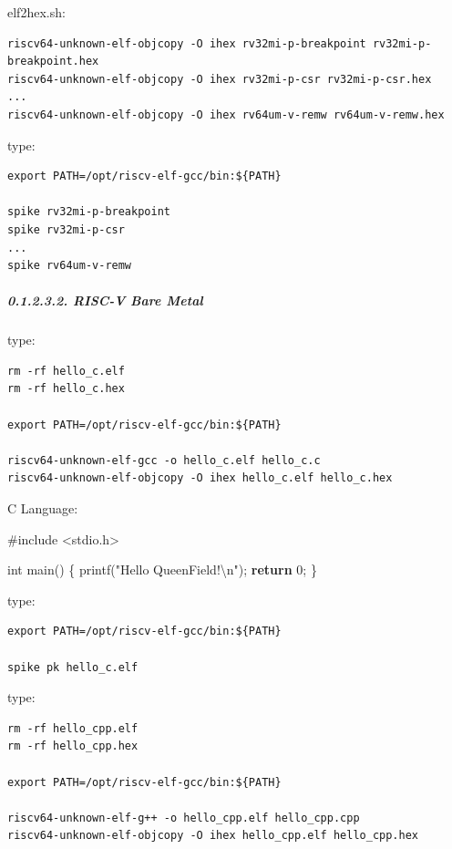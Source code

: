 \documentclass[
]{article}
\newenvironment{Shaded}{}{}
\newcommand{\ControlFlowTok}[1]{\textcolor[rgb]{0.00,0.44,0.13}{\textbf{#1}}}
\newcommand{\DataTypeTok}[1]{\textcolor[rgb]{0.56,0.13,0.00}{#1}}
\newcommand{\DecValTok}[1]{\textcolor[rgb]{0.25,0.63,0.44}{#1}}
\newcommand{\ImportTok}[1]{#1}
\newcommand{\NormalTok}[1]{#1}
\newcommand{\PreprocessorTok}[1]{\textcolor[rgb]{0.74,0.48,0.00}{#1}}
\newcommand{\SpecialCharTok}[1]{\textcolor[rgb]{0.25,0.44,0.63}{#1}}
\newcommand{\StringTok}[1]{\textcolor[rgb]{0.25,0.44,0.63}{#1}}
\begin{document}
elf2hex.sh:

\begin{verbatim}
riscv64-unknown-elf-objcopy -O ihex rv32mi-p-breakpoint rv32mi-p-breakpoint.hex
riscv64-unknown-elf-objcopy -O ihex rv32mi-p-csr rv32mi-p-csr.hex
...
riscv64-unknown-elf-objcopy -O ihex rv64um-v-remw rv64um-v-remw.hex
\end{verbatim}

type:

\begin{verbatim}
export PATH=/opt/riscv-elf-gcc/bin:${PATH}

spike rv32mi-p-breakpoint
spike rv32mi-p-csr
...
spike rv64um-v-remw
\end{verbatim}

\hypertarget{risc-v-bare-metal-1}{%
\subparagraph{0.1.2.3.2. RISC-V Bare Metal}\label{risc-v-bare-metal-1}}

type:

\begin{verbatim}
rm -rf hello_c.elf
rm -rf hello_c.hex

export PATH=/opt/riscv-elf-gcc/bin:${PATH}

riscv64-unknown-elf-gcc -o hello_c.elf hello_c.c
riscv64-unknown-elf-objcopy -O ihex hello_c.elf hello_c.hex
\end{verbatim}

C Language:

\begin{Shaded}
\begin{Highlighting}[]
\PreprocessorTok{\#include }\ImportTok{\textless{}stdio.h\textgreater{}}

\DataTypeTok{int}\NormalTok{ main() \{}
\NormalTok{  printf(}\StringTok{"Hello QueenField!}\SpecialCharTok{\textbackslash{}n}\StringTok{"}\NormalTok{);}
  \ControlFlowTok{return} \DecValTok{0}\NormalTok{;}
\NormalTok{\}}
\end{Highlighting}
\end{Shaded}

type:

\begin{verbatim}
export PATH=/opt/riscv-elf-gcc/bin:${PATH}

spike pk hello_c.elf
\end{verbatim}

type:

\begin{verbatim}
rm -rf hello_cpp.elf
rm -rf hello_cpp.hex

export PATH=/opt/riscv-elf-gcc/bin:${PATH}

riscv64-unknown-elf-g++ -o hello_cpp.elf hello_cpp.cpp
riscv64-unknown-elf-objcopy -O ihex hello_cpp.elf hello_cpp.hex
\end{verbatim}
\end{document}
